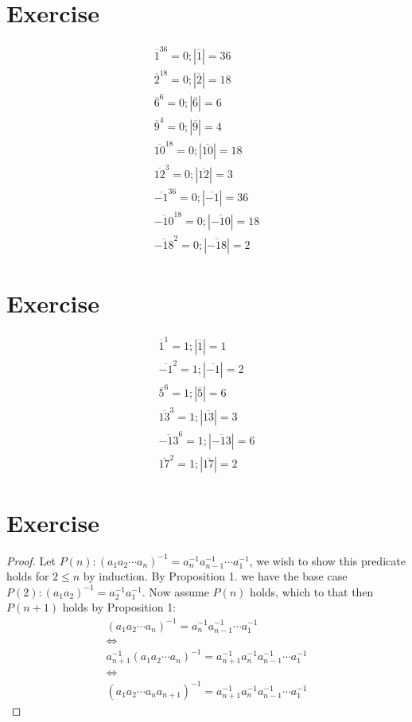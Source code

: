 \documentclass{article}
\begin{document}
\section{Exercise}
\begin{align*}
    \overline{1}^{36} = 0; |\overline{1}| = 36 \\
    \overline{2}^{18} = 0; |\overline{2}| = 18 \\
    \overline{6}^{6} = 0; |\overline{6}| = 6 \\
    \overline{9}^{4} = 0; |\overline{9}| = 4 \\
    \overline{10}^{18} = 0; |\overline{10}| = 18 \\
    \overline{12}^{3} = 0; |\overline{12}| = 3 \\
    \overline{-1}^{36} = 0; |\overline{-1}| = 36 \\
    \overline{-10}^{18} = 0; |\overline{-10}| = 18 \\
    \overline{-18}^{2} = 0; |\overline{-18}| = 2
\end{align*}
\section{Exercise}
\begin{align*}
    \overline{1}^{1} = 1; |\overline{1}| = 1 \\
    \overline{-1}^{2} = 1; |\overline{-1}| = 2 \\
    \overline{5}^{6} = 1; |\overline{5}| = 6 \\
    \overline{13}^{3} = 1; |\overline{13}| = 3 \\
    \overline{-13}^{6} = 1; |\overline{-13}| = 6\\
    \overline{17}^{2} = 1; |\overline{17}| = 2
\end{align*}
\section{Exercise}
\begin{proof}
    Let $P(n): (a_1a_2\cdots a_n)^{-1} = a_{n}^{-1}a_{n - 1}^{-1} \cdots
    a_{1}^{-1}$, we wish to show this predicate holds for $2 \leq n$ by
    induction. By Proposition 1. we have the base case $P(2): (a_1a_2)^{-1} =
    a_{2}^{-1}a_{1}^{-1}$. Now assume $P(n)$ holds, which to that then
    $P(n + 1)$ holds by Proposition 1:
    \begin{gather*}
        (a_1a_2\cdots a_n)^{-1} = a_{n}^{-1}a_{n - 1}^{-1} \cdots a_{1}^{-1} \\
        \iff \\
        a_{n + 1}^{-1} (a_1a_2\cdots a_n)^{-1} = a_{n + 1}^{-1}a_{n}^{-1}a_{n - 1}^{-1} \cdots a_{1}^{-1} \\
        \iff \\
        (a_1a_2\cdots a_n a_{n + 1})^{-1} = a_{n + 1}^{-1}a_{n}^{-1}a_{n - 1}^{-1} \cdots a_{1}^{-1}
    \end{gather*}
\end{proof}
\end{document}
